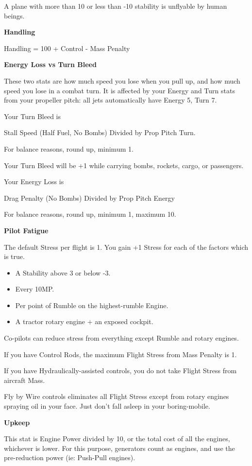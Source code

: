 \documentclass{article}
\begin{document}
A plane with more than 10 or less than -10 stability is unflyable
by human beings.

\textbf{Handling}

Handling = 100 + Control - Mass Penalty

\textbf{Energy Loss vs Turn Bleed}

These two stats are how much speed you lose when you pull up, and
how much speed you lose in a combat turn. It is affected by your Energy
and Turn stats from your propeller pitch: all jets automatically have
Energy 5, Turn 7.

Your Turn Bleed is

Stall Speed (Half Fuel, No Bombs) Divided by Prop Pitch Turn.

For balance reasons, round up, minimum 1.

Your Turn Bleed will be +1 while carrying bombs, rockets, cargo,
or passengers.

Your Energy Loss is

Drag Penalty (No Bombs) Divided by Prop Pitch Energy

For balance reasons, round up, minimum 1, maximum 10.

\textbf{Pilot Fatigue}

The default Stress per flight is 1. You gain +1 Stress for each
of the factors which is true.

\begin{itemize}
  \item A Stability above 3 or below -3.
  \item Every 10MP.
  \item Per point of Rumble on the highest-rumble Engine.
  \item A tractor rotary engine + an exposed cockpit.
\end{itemize}

Co-pilots can reduce stress from everything except Rumble and
rotary engines.

If you have Control Rods, the maximum Flight Stress from Mass
Penalty is 1.

If you have Hydraulically-assisted controls, you do not take
Flight Stress from aircraft Mass.

Fly by Wire controls eliminates all Flight Stress except from
rotary engines spraying oil in your face. Just don't fall asleep in your
boring-mobile.

\textbf{Upkeep}

This stat is Engine Power divided by 10, or the total cost of all
the engines, whichever is lower.  For this purpose, generators count
as engines, and use the pre-reduction power (ie: Push-Pull engines).
\end{document}

